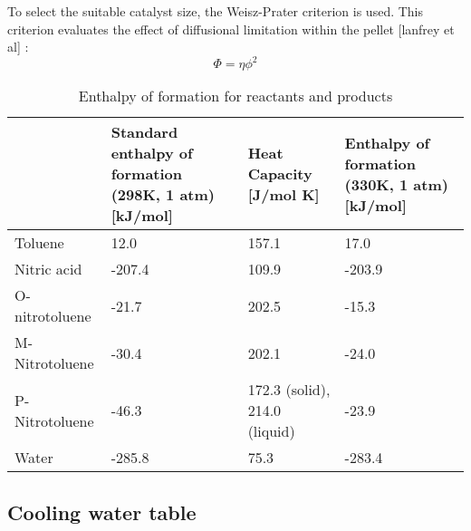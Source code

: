 To select the suitable catalyst size, the Weisz-Prater criterion is used. This criterion evaluates the effect of diffusional limitation within the pellet [lanfrey et al] :
\begin{equation}
    \Phi = \eta \phi^2
\end{equation}

\begin{table}[H]
\centering
\caption{Enthalpy of formation for reactants and products}
\label{tab:Heat enthalpy table}
\begin{tabularx}{\linewidth}{l|XXX}
\toprule
                                                                & Standard enthalpy of formation (298K, 1 atm) [kJ/mol] & Heat Capacity [J/mol K] & Enthalpy of formation (330K, 1 atm) [kJ/mol] \\ \midrule
Toluene                        & 12.0              & 157.1              & 17.0                     \\
Nitric acid                      & -207.4              & 109.9              & -203.9                       \\
O-nitrotoluene & -21.7             & 202.5              & -15.3              \\ 
M-Nitrotoluene                      & -30.4              & 202.1             & -24.0                       \\
P-Nitrotoluene                      & -46.3              & 172.3 (solid), 214.0 (liquid)             & -23.9                        \\
Water                     & -285.8              & 75.3              & -283.4                        \\
\bottomrule
\end{tabularx}
\end{table}

\subsection{Cooling water table}
\begin{table}[]
\centering
\caption{Cooling water sources for R101}
\label{tab:cwtable}
\end{table}

